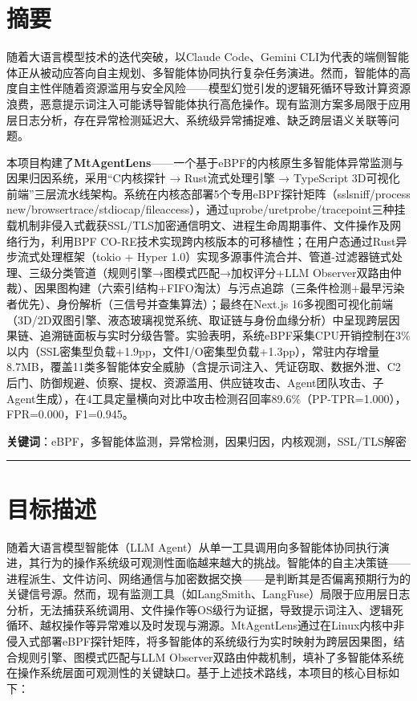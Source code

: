 \documentclass[a4paper]{ctexart}
\makeatletter
\renewcommand{\_}{%
  \ifmmode
    \nfss@text{\textunderscore}%
  \else
    \textunderscore\discretionary{}{}{}%
  \fi}
\makeatother
\begin{document}
\newpage

\section*{摘要}



随着大语言模型技术的迭代突破，以Claude Code、Gemini CLI为代表的端侧智能体正从被动应答向自主规划、多智能体协同执行复杂任务演进。然而，智能体的高度自主性伴随着资源滥用与安全风险——模型幻觉引发的逻辑死循环导致计算资源浪费，恶意提示词注入可能诱导智能体执行高危操作。现有监测方案多局限于应用层日志分析，存在异常检测延迟大、系统级异常捕捉难、缺乏跨层语义关联等问题。


本项目构建了\textbf{MtAgentLens}——一个基于eBPF的内核原生多智能体异常监测与因果归因系统，采用“C内核探针 → Rust流式处理引擎 → TypeScript 3D可视化前端”三层流水线架构。系统在内核态部署5个专用eBPF探针矩阵（sslsniff/process\_new/browsertrace/stdiocap/fileaccess），通过uprobe/uretprobe/tracepoint三种挂载机制非侵入式截获SSL/TLS加密通信明文、进程生命周期事件、文件操作及网络行为，利用BPF CO-RE技术实现跨内核版本的可移植性；在用户态通过Rust异步流式处理框架（tokio + Hyper 1.0）实现多源事件流合并、管道-过滤器链式处理、三级分类管道（规则引擎→图模式匹配→加权评分+LLM Observer双路由仲裁）、因果图构建（六索引结构+FIFO淘汰）与污点追踪（三条件检测+最早污染者优先）、身份解析（三信号并查集算法）；最终在Next.js 16多视图可视化前端（3D/2D双图引擎、液态玻璃视觉系统、取证链与身份血缘分析）中呈现跨层因果链、追溯链面板与实时分级告警。实验表明，系统eBPF采集CPU开销控制在3\%以内（SSL密集型负载+1.9pp，文件I/O密集型负载+1.3pp），常驻内存增量8.7MB，覆盖11类多智能体安全威胁（含提示词注入、凭证窃取、数据外泄、C2后门、防御规避、侦察、提权、资源滥用、供应链攻击、Agent团队攻击、子Agent生成），在4工具定量横向对比中攻击检测召回率89.6\%（PP-TPR=1.000），FPR=0.000，F1=0.945。


\textbf{关键词}：eBPF，多智能体监测，异常检测，因果归因，内核观测，SSL/TLS解密


\bigskip
\hrule
\bigskip

\newpage

\tableofcontents
\newpage

\setcounter{page}{1}

\section{目标描述}



随着大语言模型智能体（LLM Agent）从单一工具调用向多智能体协同执行演进，其行为的操作系统级可观测性面临越来越大的挑战。智能体的自主决策链——进程派生、文件访问、网络通信与加密数据交换——是判断其是否偏离预期行为的关键信号源。然而，现有监测工具（如LangSmith、LangFuse）局限于应用层日志分析，无法捕获系统调用、文件操作等OS级行为证据，导致提示词注入、逻辑死循环、越权操作等异常难以及时发现与溯源。MtAgentLens通过在Linux内核中非侵入式部署eBPF探针矩阵，将多智能体的系统级行为实时映射为跨层因果图，结合规则引擎、图模式匹配与LLM Observer双路由仲裁机制，填补了多智能体系统在操作系统层面可观测性的关键缺口。基于上述技术路线，本项目的核心目标如下：
\end{document}
